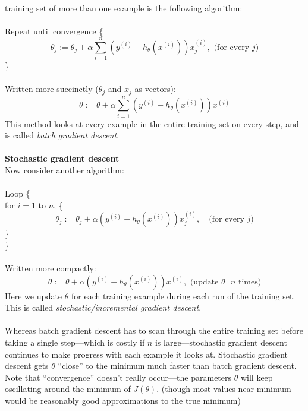 \documentclass{report}
\begin{document}
training set of more than one example is the following algorithm:\\
\vspace{1mm}\\
\indent Repeat until convergence \{
\begin{equation*}
\theta_j:=\theta_j+\alpha\sum^n_{i=1}\left(y^{(i)}-h_\theta(x^{(i)})\right)x_j^{(i)},\text{ (for every $j$)}
\end{equation*}
\indent\}\\
\vspace{1mm}\\
Written more succinctly ($\theta_j$ and $x_j$ as vectors):
\begin{equation*}
\theta:=\theta+\alpha\sum^n_{i=1}\left(y^{(i)}-h_\theta(x^{(i)})\right)x^{(i)}
\end{equation*}
This method looks at every example in the entire training set on every step, and is called 
\textit{batch gradient descent}.\\
\vspace{1mm}\\
\textbf{Stochastic gradient descent}\\
Now consider another algorithm:\\
\vspace{1mm}\\
\indent Loop \{\\
\indent\indent for $i=1$ to $n$, \{
\begin{equation*}
\theta_j:=\theta_j+\alpha\left(y^{(i)}-h_\theta(x^{(i)})\right)x_j^{(i)},\quad\text{(for every $j$)}
\end{equation*}
\indent\indent\}\\
\indent\}\\
\vspace{1mm}\\
Written more compactly:
\begin{equation*}
\theta:=\theta+\alpha\left(y^{(i)}-h_\theta(x^{(i)})\right)x^{(i)},\text{ (update $\theta$ $n$ times)}
\end{equation*}
Here we update $\theta$ for each training example during each run of the training set. This is called
\textit{stochastic/incremental gradient descent}.\\
\vspace{1mm}\\
Whereas batch gradient descent has to scan through the entire training set before taking a single step---which 
is costly if $n$ is large---stochastic gradient descent continues to make progress with each example it looks at.
Stochastic gradient descent gets $\theta$ ``close'' to the minimum much faster than batch gradient descent. Note
that ``convergence'' doesn't really occur---the parameters $\theta$ will keep oscillating around the minimum of
$J(\theta)$. (though most values near minimum would be reasonably good approximations to the true minimum)
\newpage
\subsection{}
\end{document}
